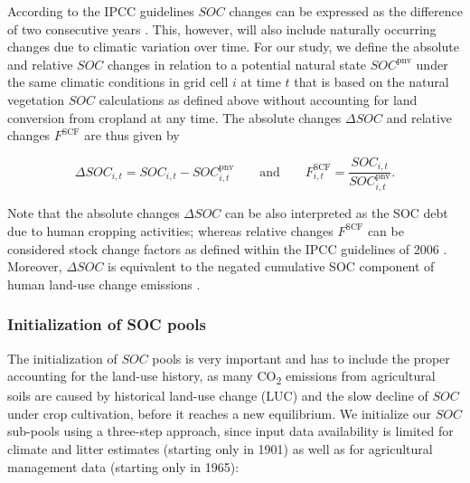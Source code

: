 \documentclass[gc, manuscript]{copernicus}
\begin{document}
According to the IPCC guidelines \(SOC\) changes can be expressed as the difference of two consecutive years \citep[see Eq. 5.0A in][]{ogle_cropland_in_ipcc_2019}. This, however, will also include naturally occurring changes due to climatic variation over time. For our study, we define the absolute and relative \(SOC\) changes in relation to a potential natural state \(SOC^{\mathrm{pnv}}\) under the same climatic conditions in grid cell \(i\) at time \(t\) that is based on the natural vegetation \(SOC\) calculations as defined above without accounting for land conversion from cropland at any time. The absolute changes \(\Delta SOC\) and relative changes \(F^{\mathrm{SCF}}\) are thus given by

\begin{equation}
\Delta SOC_{i,t} = SOC_{i,t} - SOC^{\mathrm{pnv}}_{i,t}\qquad \text{and} \qquad  F^{\mathrm{SCF}}_{i,t} = \frac{SOC_{i,t}}{SOC^{\mathrm{pnv}}_{i,t}} .
\label{eq:stockdiff}
\end{equation}

Note that the absolute changes \(\Delta SOC\) can be also interpreted as the SOC debt \citep{sanderman_soil_2017} due to human cropping activities; whereas relative changes \(F^{\mathrm{SCF}}\) can be considered stock change factors as defined within the IPCC guidelines of 2006 \citep{eggleston_ipcc_2006}. Moreover, \(\Delta SOC\) is equivalent to the negated cumulative SOC component of human land-use change emissions \citep{pugh_simulated_2015}.

\hypertarget{sec:initsoc}{%
\subsubsection{Initialization of SOC pools}\label{sec:initsoc}}

The initialization of \(SOC\) pools is very important and has to include the proper accounting for the land-use history, as many CO\textsubscript{2} emissions from agricultural soils are caused by historical land-use change (LUC) and the slow decline of \(SOC\) under crop cultivation, before it reaches a new equilibrium.
We initialize our \(SOC\) sub-pools using a three-step approach, since input data availability is limited for climate and litter estimates (starting only in 1901) as well as for agricultural management data (starting only in 1965):
\end{document}
